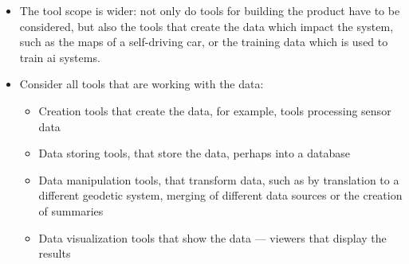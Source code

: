 \begin{itemize}
\item The tool scope is wider: not only do tools for building the product have to be considered,
  but also the tools that create the data which impact the system,
  such as the maps of a self-driving car, or the training data which is used to train \gls{ai} systems.
\item Consider all tools that are working with the data:
  \begin{itemize}
  \item Creation tools that create the data, for example, tools processing sensor data
  \item Data storing tools, that store the data, perhaps into a \gls{database}
  \item Data manipulation tools, that transform data, such as by translation to a different geodetic system, merging of different data sources or the creation of summaries
  \item Data visualization tools that show the data --- viewers that display the results
  \end{itemize}
  

\end{itemize}
